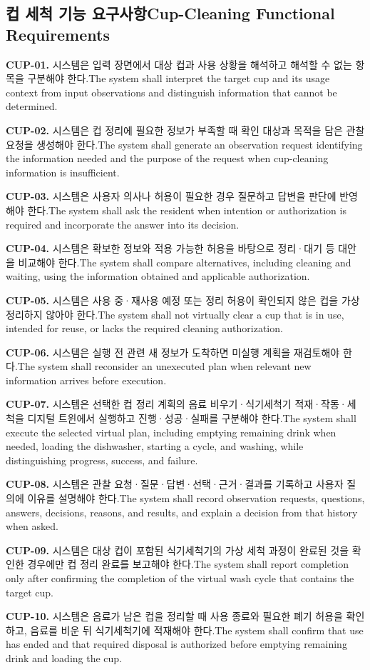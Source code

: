 \documentclass[conference,a4paper]{IEEEtran}
\newcommand{\bi}[2]{\ifKorean#1\else#2\fi}
\newcommand{\req}[3]{\par\noindent\textbf{#1.} \bi{#2}{#3}\par\smallskip}
\begin{document}
\subsection{\bi{컵 세척 기능 요구사항}{Cup-Cleaning Functional Requirements}}
\req{CUP-01}{시스템은 입력 장면에서 대상 컵과 사용 상황을 해석하고 해석할 수 없는 항목을 구분해야 한다.}{The system shall interpret the target cup and its usage context from input observations and distinguish information that cannot be determined.}
\req{CUP-02}{시스템은 컵 정리에 필요한 정보가 부족할 때 확인 대상과 목적을 담은 관찰 요청을 생성해야 한다.}{The system shall generate an observation request identifying the information needed and the purpose of the request when cup-cleaning information is insufficient.}
\req{CUP-03}{시스템은 사용자 의사나 허용이 필요한 경우 질문하고 답변을 판단에 반영해야 한다.}{The system shall ask the resident when intention or authorization is required and incorporate the answer into its decision.}
\req{CUP-04}{시스템은 확보한 정보와 적용 가능한 허용을 바탕으로 정리·대기 등 대안을 비교해야 한다.}{The system shall compare alternatives, including cleaning and waiting, using the information obtained and applicable authorization.}
\req{CUP-05}{시스템은 사용 중·재사용 예정 또는 정리 허용이 확인되지 않은 컵을 가상 정리하지 않아야 한다.}{The system shall not virtually clear a cup that is in use, intended for reuse, or lacks the required cleaning authorization.}
\req{CUP-06}{시스템은 실행 전 관련 새 정보가 도착하면 미실행 계획을 재검토해야 한다.}{The system shall reconsider an unexecuted plan when relevant new information arrives before execution.}
\req{CUP-07}{시스템은 선택한 컵 정리 계획의 음료 비우기·식기세척기 적재·작동·세척을 디지털 트윈에서 실행하고 진행·성공·실패를 구분해야 한다.}{The system shall execute the selected virtual plan, including emptying remaining drink when needed, loading the dishwasher, starting a cycle, and washing, while distinguishing progress, success, and failure.}
\req{CUP-08}{시스템은 관찰 요청·질문·답변·선택·근거·결과를 기록하고 사용자 질의에 이유를 설명해야 한다.}{The system shall record observation requests, questions, answers, decisions, reasons, and results, and explain a decision from that history when asked.}
\req{CUP-09}{시스템은 대상 컵이 포함된 식기세척기의 가상 세척 과정이 완료된 것을 확인한 경우에만 컵 정리 완료를 보고해야 한다.}{The system shall report completion only after confirming the completion of the virtual wash cycle that contains the target cup.}
\req{CUP-10}{시스템은 음료가 남은 컵을 정리할 때 사용 종료와 필요한 폐기 허용을 확인하고, 음료를 비운 뒤 식기세척기에 적재해야 한다.}{The system shall confirm that use has ended and that required disposal is authorized before emptying remaining drink and loading the cup.}
\end{document}
